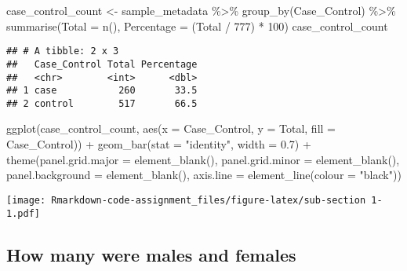 \documentclass[
]{article}
\newenvironment{Shaded}{\begin{snugshade}}{\end{snugshade}}
\newcommand{\AttributeTok}[1]{\textcolor[rgb]{0.77,0.63,0.00}{#1}}
\newcommand{\DecValTok}[1]{\textcolor[rgb]{0.00,0.00,0.81}{#1}}
\newcommand{\FloatTok}[1]{\textcolor[rgb]{0.00,0.00,0.81}{#1}}
\newcommand{\FunctionTok}[1]{\textcolor[rgb]{0.00,0.00,0.00}{#1}}
\newcommand{\NormalTok}[1]{#1}
\newcommand{\OtherTok}[1]{\textcolor[rgb]{0.56,0.35,0.01}{#1}}
\newcommand{\SpecialCharTok}[1]{\textcolor[rgb]{0.00,0.00,0.00}{#1}}
\newcommand{\StringTok}[1]{\textcolor[rgb]{0.31,0.60,0.02}{#1}}
\begin{document}
\begin{Shaded}
\begin{Highlighting}[]
\NormalTok{case\_control\_count }\OtherTok{\textless{}{-}}\NormalTok{ sample\_metadata }\SpecialCharTok{\%\textgreater{}\%} 
  \FunctionTok{group\_by}\NormalTok{(Case\_Control) }\SpecialCharTok{\%\textgreater{}\%} 
  \FunctionTok{summarise}\NormalTok{(}\AttributeTok{Total =} \FunctionTok{n}\NormalTok{(), }\AttributeTok{Percentage =}\NormalTok{ (Total }\SpecialCharTok{/} \DecValTok{777}\NormalTok{) }\SpecialCharTok{*} \DecValTok{100}\NormalTok{)}
\NormalTok{case\_control\_count}
\end{Highlighting}
\end{Shaded}

\begin{verbatim}
## # A tibble: 2 x 3
##   Case_Control Total Percentage
##   <chr>        <int>      <dbl>
## 1 case           260       33.5
## 2 control        517       66.5
\end{verbatim}

\begin{Shaded}
\begin{Highlighting}[]
\FunctionTok{ggplot}\NormalTok{(case\_control\_count, }\FunctionTok{aes}\NormalTok{(}\AttributeTok{x =}\NormalTok{ Case\_Control, }\AttributeTok{y =}\NormalTok{ Total, }\AttributeTok{fill =}\NormalTok{ Case\_Control)) }\SpecialCharTok{+} 
  \FunctionTok{geom\_bar}\NormalTok{(}\AttributeTok{stat =} \StringTok{"identity"}\NormalTok{, }\AttributeTok{width =} \FloatTok{0.7}\NormalTok{) }\SpecialCharTok{+} 
  \FunctionTok{theme}\NormalTok{(}\AttributeTok{panel.grid.major =} \FunctionTok{element\_blank}\NormalTok{(), }\AttributeTok{panel.grid.minor =} \FunctionTok{element\_blank}\NormalTok{(),}
        \AttributeTok{panel.background =} \FunctionTok{element\_blank}\NormalTok{(), }\AttributeTok{axis.line =} \FunctionTok{element\_line}\NormalTok{(}\AttributeTok{colour =} \StringTok{"black"}\NormalTok{))}
\end{Highlighting}
\end{Shaded}

\texttt{[image: Rmarkdown-code-assignment\_files/figure-latex/sub-section 1-1.pdf]}

\hypertarget{how-many-were-males-and-females}{%
\subsection{How many were males and
females}\label{how-many-were-males-and-females}}
\end{document}
